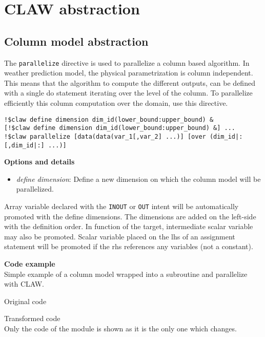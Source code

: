\section{CLAW abstraction}


\subsection{Column model abstraction}

The \lstinline!parallelize! directive is used to parallelize a column based
algorithm. In weather prediction model, the physical parametrization is column
independent. This means that the algorithm to compute the different outputs, can
be defined with a single do statement iterating over the level of the column.
To parallelize efficiently this column computation over the domain, use this
directive. 

\begin{lstlisting}
!$claw define dimension dim_id(lower_bound:upper_bound) &
[!$claw define dimension dim_id(lower_bound:upper_bound) &] ...
!$claw parallelize [data(data(var_1[,var_2] ...)] [over (dim_id|:[,dim_id|:] ...)]
\end{lstlisting}

\textbf{Options and details}
\begin{itemize}
\item \textit{define dimension}: Define a new dimension on which the column
model will be parallelized.
\end{itemize}

Array variable declared with the \lstinline!INOUT! or \lstinline!OUT! intent
will be automatically promoted with the define dimensions. The dimensions are
added on the left-side with the definition order.
In function of the target, intermediate scalar variable may also be promoted.
Scalar variable placed on the lhs of an assignment statement will be promoted
if the rhs references any variables (not a constant).

\textbf{Code example}\\
\label{parallelize1}
Simple example of a column model wrapped into a subroutine and parallelize with
CLAW.

Original code



Transformed code\\
Only the code of the module is shown as it is the only one which changes.\\

